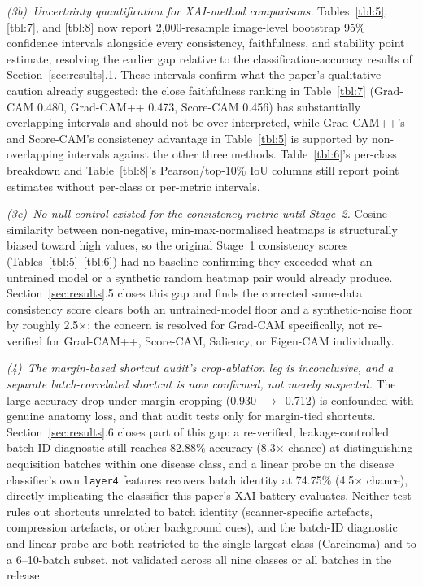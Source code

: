 \textit{(3b)~Uncertainty quantification for XAI-method comparisons.} Tables~\ref{tbl:5}, \ref{tbl:7}, and \ref{tbl:8} now report 2,000-resample image-level bootstrap 95\% confidence intervals alongside every consistency, faithfulness, and stability point estimate, resolving the earlier gap relative to the classification-accuracy results of Section~\ref{sec:results}.1. These intervals confirm what the paper's qualitative caution already suggested: the close faithfulness ranking in Table~\ref{tbl:7} (Grad-CAM 0.480, Grad-CAM++ 0.473, Score-CAM 0.456) has substantially overlapping intervals and should not be over-interpreted, while Grad-CAM++'s and Score-CAM's consistency advantage in Table~\ref{tbl:5} is supported by non-overlapping intervals against the other three methods. Table~\ref{tbl:6}'s per-class breakdown and Table~\ref{tbl:8}'s Pearson/top-10\% IoU columns still report point estimates without per-class or per-metric intervals.

\textit{(3c)~No null control existed for the consistency metric until Stage~2.} Cosine similarity between non-negative, min-max-normalised heatmaps is structurally biased toward high values, so the original Stage~1 consistency scores (Tables~\ref{tbl:5}--\ref{tbl:6}) had no baseline confirming they exceeded what an untrained model or a synthetic random heatmap pair would already produce. Section~\ref{sec:results}.5 closes this gap and finds the corrected same-data consistency score clears both an untrained-model floor and a synthetic-noise floor by roughly 2.5$\times$; the concern is resolved for Grad-CAM specifically, not re-verified for Grad-CAM++, Score-CAM, Saliency, or Eigen-CAM individually.

\textit{(4)~The margin-based shortcut audit's crop-ablation leg is inconclusive, and a separate batch-correlated shortcut is now confirmed, not merely suspected.} The large accuracy drop under margin cropping (0.930~$\rightarrow$~0.712) is confounded with genuine anatomy loss, and that audit tests only for margin-tied shortcuts. Section~\ref{sec:results}.6 closes part of this gap: a re-verified, leakage-controlled batch-ID diagnostic still reaches 82.88\% accuracy (8.3$\times$ chance) at distinguishing acquisition batches within one disease class, and a linear probe on the disease classifier's own \texttt{layer4} features recovers batch identity at 74.75\% (4.5$\times$ chance), directly implicating the classifier this paper's XAI battery evaluates. Neither test rules out shortcuts unrelated to batch identity (scanner-specific artefacts, compression artefacts, or other background cues), and the batch-ID diagnostic and linear probe are both restricted to the single largest class (Carcinoma) and to a 6--10-batch subset, not validated across all nine classes or all batches in the release.

